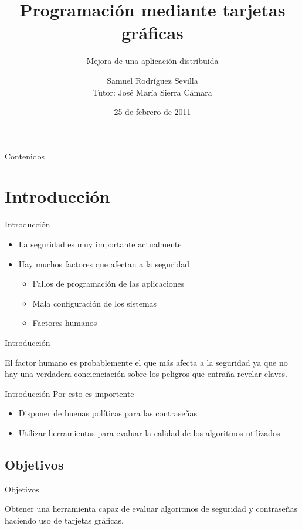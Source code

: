 \documentclass[12pt]{beamer}
\title[Mejora aplicación distribuida]{Programación mediante tarjetas gráficas}
\subtitle{Mejora de una aplicación distribuida}
\author[Samuel Rodríguez]{Samuel Rodríguez Sevilla\\Tutor: José María Sierra Cámara}
\date{25 de febrero de 2011}
\newcommand{\mysection}[1]{\section{#1}}
\begin{document}
\frame{\titlepage}



\begin{frame}{Contenidos}
	\tableofcontents[pausesections]
\end{frame}

\mysection{Introducción}
\begin{frame}{Introducción}
	\begin{itemize}
		\item La seguridad es muy importante actualmente
		\item Hay muchos factores que afectan a la seguridad
		\begin{itemize}
			\item Fallos de programación de las aplicaciones
			\item Mala configuración de los sistemas
			\item Factores humanos
		\end{itemize}
	\end{itemize}
\end{frame}

\begin{frame}{Introducción}
	\begin{center}
		El factor humano es probablemente el que más afecta a la seguridad ya que no hay una verdadera concienciación sobre los peligros que entraña revelar claves.
	\end{center}
\end{frame}

\begin{frame}{Introducción}
	Por esto es importente
	\pause
	\begin{itemize}
		\item Disponer de buenas políticas para las contraseñas
		\item Utilizar herramientas para evaluar la calidad de los algoritmos utilizados
	\end{itemize}
\end{frame}

\subsection{Objetivos}
\begin{frame}{Objetivos}
	\begin{center}
		Obtener una herramienta capaz de evaluar algoritmos de seguridad y contraseñas haciendo uso de tarjetas gráficas.
	\end{center}
\end{frame}
\end{document}
